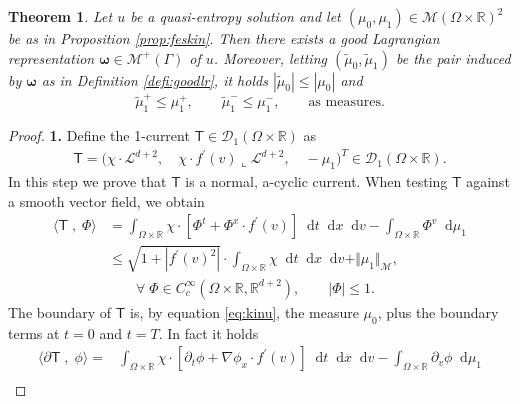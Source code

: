 \documentclass[11pt, twoside, reqno]{amsart}
\newtheorem{thm}{Theorem}[section]
\theoremstyle{definition}
\theoremstyle{remark}
\numberwithin{equation}{section}
\newcommand*\dif{\mathop{}\!\mathrm{d}}
\newcommand{\bs}[1]{\boldsymbol{#1}}
\newcommand{\ms}[1]{\mathsf{#1}}
\newcommand{\msc}[1]{\mathscr{#1}}
\newcommand{\wt}[1]{\widetilde{#1}}
\begin{document}
\begin{thm}\label{thm:lagraex}
    Let $u$ be a quasi-entropy solution and let $(\mu_0, \mu_1) \in \mathscr M(\Omega \times \mathbb R)^2$ be as in Proposition \ref{prop:feskin}. Then there exists a good Lagrangian representation $\boldsymbol{\omega} \in \mathscr M^+(\Gamma)$ of $u$.  Moreover, letting $(\wt\mu_0, \wt \mu_1)$ be the pair induced by $\bs \omega$ as in Definition \ref{defi:goodlr}, it holds $|\wt \mu_0| \leq |\mu_0|$ and
    \begin{equation}\label{eq:newpairest}
        \wt \mu_1^+ \leq \mu_1^+, \qquad \wt \mu_1^- \leq \mu_1^-, \qquad \text{as measures}.
    \end{equation}
\end{thm}

\begin{proof}
\textbf{1.}   Define the 1-current $\ms T \in \mathscr D_1(\Omega \times \mathbb R)$ as
  \begin{equation}\label{eq:Tdef}
  \begin{aligned}
    \ms T = \Big( \chi \cdot \msc L^{d+2}, \quad  \chi \cdot f^{\prime}(v) \llcorner \msc L^{d+2},\quad -\mu_1\Big)^T  \in \mathscr D_1(\Omega \times \mathbb R).
      \end{aligned}
    \end{equation}
    In this step we prove that $\ms T$ is a normal, a-cyclic current.
When testing $\ms T$ against a smooth vector field, we obtain
\begin{equation}
    \begin{aligned}
        \langle \ms T \; , \; \Phi \rangle  & = \int_{\Omega \times \mathbb R} \chi \cdot [ \Phi^t + \Phi^x \cdot f^{\prime}(v) ] \dif t \dif x \dif v - \int_{\Omega \times \mathbb R} \Phi^v \dif \mu_1   \\
        &  \leq \sqrt{1 + |f^{\prime}(v)^2|}\cdot  \int_{\Omega \times \mathbb R} \chi \dif t \dif x \dif v  +\Vert\mu_1\Vert_{\msc M}, \\
        & \qquad \forall\;  \Phi \in C^\infty_c(\Omega \times \mathbb R, \mathbb R^{d+2}), \qquad |\Phi| \leq 1.
    \end{aligned}
\end{equation}
The boundary of $\ms T$ is, by equation \eqref{eq:kinu}, the measure $\mu_0$, plus the boundary terms at $t = 0$ and $t = T$. In fact it holds
\begin{equation}
\begin{aligned}
\langle \partial \ms T \; , \; \phi\rangle  =&  \int_{\Omega \times \mathbb R} \chi \cdot [\partial_t \phi + \nabla  \phi_x \cdot f^{\prime}(v) ] \dif t \dif x \dif v - \int_{\Omega \times \mathbb R} \partial_v  \phi \dif \mu_1   \\

\end{aligned}
\end{equation}
\end{proof}
\end{document}
